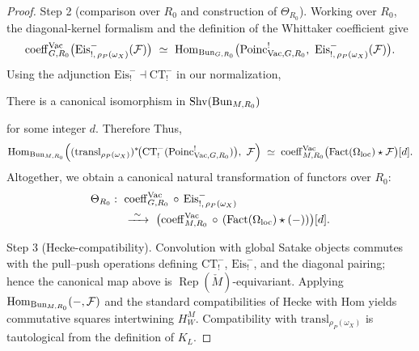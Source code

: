 \begin{proof}
Step 2 (comparison over $R_0$ and construction of $\Theta_{R_0}$). Working over $R_0$, the diagonal-kernel formalism and the definition of the Whittaker coefficient give
\[
\coeff^{\Vac}_{G,R_0}\bigl(\mathrm{Eis}^-_{!,\,\rho_P(\omega_X)}(\mathcal F)\bigr)
\ \simeq\ \operatorname{Hom}_{\Bun_{G,R_0}}\bigl(\Poinc^{!}_{\Vac,G,R_0},\ \mathrm{Eis}^-_{!,\,\rho_P(\omega_X)}(\mathcal F)\bigr).
\]
Using the adjunction $\mathrm{Eis}^-_!\dashv\mathrm{CT}^-_!$ in our normalization,
\begin{center}
\end{center}
There is a canonical isomorphism in $\mathrm{Shv}(\mathrm{Bun}_{M,R_0})$
\begin{center}
\end{center}
for some integer $d$. Therefore
Thus,
\[
\operatorname{Hom}_{\Bun_{M,R_0}}\Bigl((\mathrm{transl}_{\rho_P(\omega_X)})^*\!\bigl(\mathrm{CT}^-_!(\Poinc^{!}_{\Vac,G,R_0})\bigr),\ \mathcal F\Bigr)
\;\simeq\; \coeff^{\Vac}_{M,R_0}\bigl(\mathrm{Fact}(\Omega_{\mathrm{loc}})\star \mathcal F\bigr)[d].
\]
Altogether, we obtain a canonical natural transformation of functors over $R_0$:
\[
\begin{aligned}
\Theta_{R_0}:\ &\; \coeff^{\Vac}_{G,R_0}\ccomp \mathrm{Eis}^-_{!,\,\rho_P(\omega_X)}\\
&\; \xrightarrow{\ \sim\ }\ \bigl(\coeff^{\Vac}_{M,R_0}\ccomp(\mathrm{Fact}(\Omega_{\mathrm{loc}})\star(-))\bigr)[d].
\end{aligned}
\]

Step 3 (Hecke-compatibility). Convolution with global Satake objects commutes with the pull--push operations defining $\mathrm{CT}^-_!$, $\mathrm{Eis}^-_!$, and the diagonal pairing; hence the canonical map above is $\operatorname{Rep}(\check M)$-equivariant. Applying $\operatorname{Hom}_{\mathrm{Bun}_{M,R_0}}(-,\mathcal F)$ and the standard compatibilities of Hecke with Hom yields commutative squares intertwining $H^M_W$. Compatibility with $\mathrm{transl}_{\rho_P(\omega_X)}$ is tautological from the definition of $K_L$.


\end{proof}
